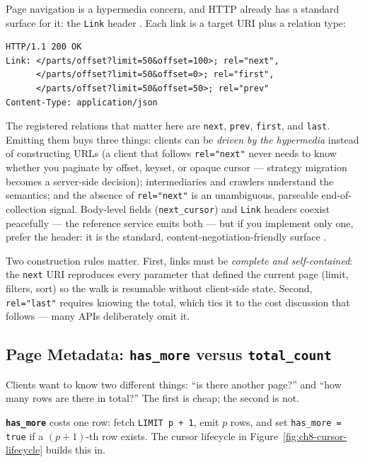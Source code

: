 Page navigation is a hypermedia concern, and HTTP already has a standard
surface for it: the \texttt{Link} header \cite{rfc8288}. Each link is a
target URI plus a relation type:

\begin{verbatim}
HTTP/1.1 200 OK
Link: </parts/offset?limit=50&offset=100>; rel="next",
      </parts/offset?limit=50&offset=0>; rel="first",
      </parts/offset?limit=50&offset=50>; rel="prev"
Content-Type: application/json
\end{verbatim}

The registered relations that matter here are \texttt{next}, \texttt{prev},
\texttt{first}, and \texttt{last}. Emitting them buys three things:
clients can be \emph{driven by the hypermedia} instead of constructing URLs
(a client that follows \texttt{rel="next"} never needs to know whether you
paginate by offset, keyset, or opaque cursor --- strategy migration becomes
a server-side decision); intermediaries and crawlers understand the
semantics; and the absence of \texttt{rel="next"} is an unambiguous,
parseable end-of-collection signal. Body-level fields (\texttt{next\_cursor})
and \texttt{Link} headers coexist peacefully --- the reference service emits
both --- but if you implement only one, prefer the header: it is the
standard, content-negotiation-friendly surface \cite{rfc9110}.

Two construction rules matter. First, links must be \emph{complete and
self-contained}: the \texttt{next} URI reproduces every parameter that
defined the current page (limit, filters, sort) so the walk is resumable
without client-side state. Second, \texttt{rel="last"} requires knowing the
total, which ties it to the cost discussion that follows --- many APIs
deliberately omit it.

\subsection{Page Metadata: \texttt{has\_more} versus \texttt{total\_count}}
\label{subsec:ch8-metadata}

Clients want to know two different things: ``is there another page?'' and
``how many rows are there in total?'' The first is cheap; the second is not.

\textbf{\texttt{has\_more}} costs one row: fetch \texttt{LIMIT p + 1}, emit
$p$ rows, and set \texttt{has\_more = true} if a $(p{+}1)$-th row exists.
The cursor lifecycle in Figure~\ref{fig:ch8-cursor-lifecycle} builds this in.

